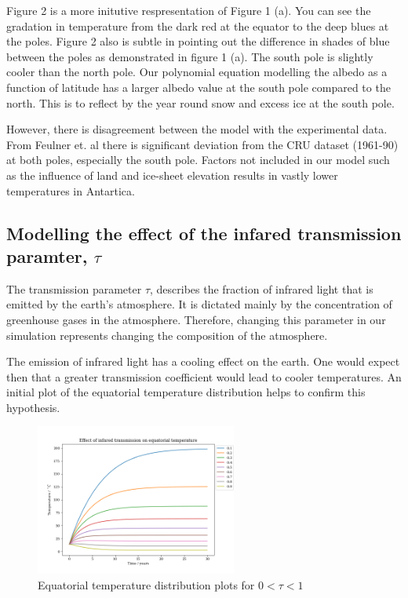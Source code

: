 \documentclass{article}%
\begin{document}
Figure 2 is a more initutive respresentation of Figure 1 (a). You can see the gradation in temperature from the dark red at the equator to the deep blues at the poles.
Figure 2 also is subtle in pointing out the difference in shades of blue between the poles as demonstrated in figure 1 (a). The south pole is slightly cooler than the north pole. 
Our polynomial equation modelling the albedo as a function of latitude has a larger albedo value at the south pole compared to the north. \cite{Lacis}
This is to reflect by the year round snow and excess ice at the south pole. \par
However, there is disagreement between the model with the experimental data. From Feulner et. al \cite{Feulner} there is significant deviation from the CRU dataset (1961-90) at both poles, especially the south pole.
Factors not included in our model such as the influence of land and ice-sheet elevation results in vastly lower temperatures in Antartica. \cite{Feulner} 

\subsection{Modelling the effect of the infared transmission paramter, $ \tau$ }
The transmission parameter $\tau$, describes the fraction of infrared light that is emitted by the earth's atmosphere. It is dictated mainly by the concentration of greenhouse
gases in the atmosphere. Therefore, changing this parameter in our simulation represents changing the composition of the atmosphere. \par
The emission of infrared light has a cooling effect on the earth. One would expect then that a greater transmission coefficient would lead to cooler temperatures.
An initial plot of the equatorial temperature distribution helps to confirm this hypothesis.

\begin{figure}[H]%
  \centering%
  \includegraphics[width=250px]{temperature-distributions-IR.png}
  \caption{Equatorial temperature distribution plots for $ 0 < \tau < 1$}
\end{figure}
\end{document}
